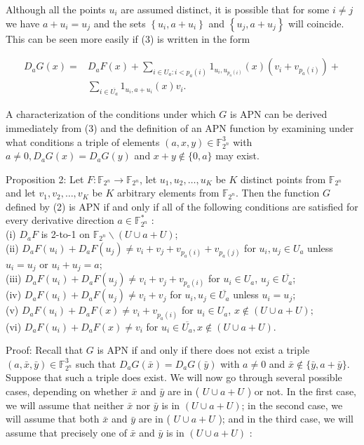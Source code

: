 \documentclass[10pt]{article}
\begin{document}
Although all the points $u_{i}$ are assumed distinct, it is possible that for some $i \neq j$ we have $a+u_{i}=u_{j}$ and the sets $\left\{u_{i}, a+u_{i}\right\}$ and $\left\{u_{j}, a+u_{j}\right\}$ will coincide. This can be seen more easily if (3) is written in the form


\begin{align*}
D_{a} G(x)= & D_{a} F(x)+\sum_{i \in U_{a}: i<p_{a}(i)} 1_{u_{i}, u_{p_{a}(i)}}(x)\left(v_{i}+v_{p_{a}(i)}\right)+ \\
& \sum_{i \in \overline{U_{a}}} 1_{u_{i}, a+u_{i}}(x) v_{i} . \tag{4}
\end{align*}


A characterization of the conditions under which $G$ is APN can be derived immediately from (3) and the definition of an APN function by examining under what conditions a triple of elements $(a, x, y) \in \mathbb{F}_{2^{n}}^{3}$ with $a \neq 0, D_{a} G(x)=D_{a} G(y)$ and $x+y \notin\{0, a\}$ may exist.

Proposition 2: Let $F: \mathbb{F}_{2^{n}} \rightarrow \mathbb{F}_{2^{n}}$, let $u_{1}, u_{2}, \ldots, u_{K}$ be $K$ distinct points from $\mathbb{F}_{2^{n}}$ and let $v_{1}, v_{2}, \ldots, v_{K}$ be $K$ arbitrary elements from $\mathbb{F}_{2^{n}}$. Then the function $G$ defined by (2) is APN if and only if all of the following conditions are satisfied for every derivative direction $a \in \mathbb{F}_{2^{n}}^{*}$ :\\
(i) $D_{a} F$ is 2-to-1 on $\mathbb{F}_{2^{n}} \backslash(U \cup a+U)$;\\
(ii) $D_{a} F\left(u_{i}\right)+D_{a} F\left(u_{j}\right) \neq v_{i}+v_{j}+v_{p_{a}(i)}+v_{p_{a}(j)}$ for $u_{i}, u_{j} \in U_{a}$ unless $u_{i}=u_{j}$ or $u_{i}+u_{j}=a$;\\
(iii) $D_{a} F\left(u_{i}\right)+D_{a} F\left(u_{j}\right) \neq v_{i}+v_{j}+v_{p_{a}(i)}$ for $u_{i} \in U_{a}$, $u_{j} \in \overline{U_{a}}$;\\
(iv) $D_{a} F\left(u_{i}\right)+D_{a} F\left(u_{j}\right) \neq v_{i}+v_{j}$ for $u_{i}, u_{j} \in \overline{U_{a}}$ unless $u_{i}=u_{j}$;\\
(v) $D_{a} F\left(u_{i}\right)+D_{a} F(x) \neq v_{i}+v_{p_{a}(i)}$ for $u_{i} \in U_{a}$, $x \notin(U \cup a+U) ;$\\
(vi) $D_{a} F\left(u_{i}\right)+D_{a} F(x) \neq v_{i}$ for $u_{i} \in \overline{U_{a}}, x \notin(U \cup a+U)$.

Proof: Recall that $G$ is APN if and only if there does not exist a triple $(a, \bar{x}, \bar{y}) \in \mathbb{F}_{2^{n}}^{3}$ such that $D_{a} G(\bar{x})=D_{a} G(\bar{y})$ with $a \neq 0$ and $\bar{x} \notin\{\bar{y}, a+\bar{y}\}$. Suppose that such a triple does exist. We will now go through several possible cases, depending on whether $\bar{x}$ and $\bar{y}$ are in ( $U \cup a+U$ ) or not. In the first case, we will assume that neither $\bar{x}$ nor $\bar{y}$ is in $(U \cup a+U)$; in the second case, we will assume that both $\bar{x}$ and $\bar{y}$ are in ( $U \cup a+U$ ); and in the third case, we will assume that precisely one of $\bar{x}$ and $\bar{y}$ is in $(U \cup a+U)$ :
\end{document}
